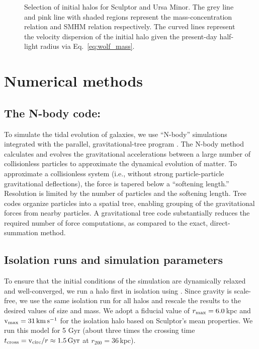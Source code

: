 \begin{figure}
\centering
{}
\caption[Initial halo selection]{Selection of initial halos for Sculptor
and Ursa Minor. The grey line and pink line with shaded regions
represent the \citet{ludlow+2016} mass-concentration relation and
\citet{fattahi+2018} SMHM relation respectively. The curved lines
represent the velocity dispersion of the initial halo given the
present-day half-light radius via
Eq.~\ref{eq:wolf_mass}.}\label{fig:scl_halos}
\end{figure}

\section{Numerical methods}\label{numerical-methods}

\subsection{\texorpdfstring{The N-body code:
\gadget{}}{The N-body code: }}\label{the-n-body-code}

To simulate the tidal evolution of galaxies, we use ``N-body''
simulations integrated with the parallel, gravitational-tree program
\gadget{} \citep{gadget4}. The N-body method calculates and evolves the
gravitational accelerations between a large number of collisionless
particles to approximate the dynamical evolution of matter. To
approximate a collisionless system (i.e., without strong
particle-particle gravitational deflections), the force is tapered below
a ``softening length.'' Resolution is limited by the number of particles
and the softening length. Tree codes organize particles into a spatial
tree, enabling grouping of the gravitational forces from nearby
particles. A gravitational tree code substantially reduces the required
number of force computations, as compared to the exact, direct-summation
method.

\subsection{Isolation runs and simulation
parameters}\label{isolation-runs-and-simulation-parameters}

To ensure that the initial conditions of the simulation are dynamically
relaxed and well-converged, we run a halo first in isolation using
\gadget{}. Since gravity is scale-free, we use the same isolation run
for all halos and rescale the results to the desired values of size and
mass. We adopt a fiducial value of \(r_{\rm max} = 6.0\,\)kpc and
\({\rm v}_{\rm max} = 31\,{\rm km\,s^{-1}}\) for the isolation halo based on Sculptor's mean
properties. We run this model for 5 Gyr (about three times the crossing
time \(t_{\rm cross} = {\rm v}_{\rm circ} / r \approx 1.5\,{\rm Gyr}\) at
\(r_{200}=36\,\)kpc).

